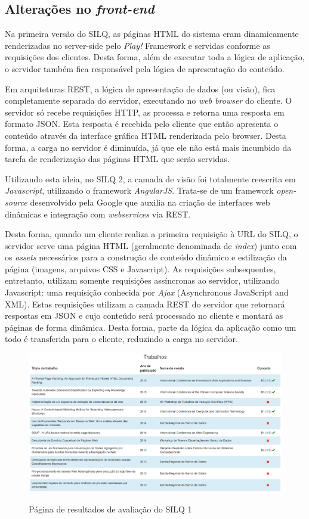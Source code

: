 \documentclass[12pt]{article}
\begin{document}
\subsection{Alterações no \textit{front-end}}

Na primeira versão do SILQ, as páginas HTML do sistema eram dinamicamente renderizadas no server-side pelo \textit{Play!} Framework e servidas conforme as requisições dos clientes. Desta forma, além de executar toda a lógica de aplicação, o servidor também fica responsável pela lógica de apresentação do conteúdo.

Em arquiteturas REST, a lógica de apresentação de dados (ou visão), fica completamente separada do servidor, executando no \textit{web browser} do cliente. O servidor só recebe requisições HTTP, as processa e retorna uma resposta em formato JSON. Esta resposta é recebida pelo cliente que então apresenta o conteúdo através da interface gráfica HTML renderizada pelo browser. Desta forma, a carga no servidor é diminuída, já que ele não está mais incumbido da tarefa de renderização das páginas HTML que serão servidas.

Utilizando esta ideia, no SILQ 2, a camada de visão foi totalmente reescrita em \textit{Javascript}, utilizando o framework \textit{AngularJS}. Trata-se de um framework \textit{open-source} desenvolvido pela Google que auxilia na criação de interfaces web dinâmicas e integração com \textit{webservices} via REST.

Desta forma, quando um cliente realiza a primeira requisição à URL do SILQ, o servidor serve uma página HTML (geralmente denominada de \textit{index}) junto com os \textit{assets} necessários para a construção de conteúdo dinâmico e estilização da página (imagens, arquivos CSS e Javascript). As requisições subsequentes, entretanto, utilizam somente requisições assíncronas ao servidor, utilizando Javascript: uma requisição conhecida por \textit{Ajax} (Asynchronous JavaScript and XML). Estas requisições utilizam a camada REST do servidor que retornará respostas em JSON e cujo conteúdo será processado no cliente e montará as páginas de forma dinâmica. Desta forma, parte da lógica da aplicação como um todo é transferida para o cliente, reduzindo a carga no servidor.

\begin{figure}[!h]
   \centering
   \caption{Página de resultados de avaliação do SILQ 1}
   \includegraphics[width=\textwidth]{../figuras/avaliacao-silq1.png}
   \label{fig:avaliacao-silq1}
\end{figure}
\end{document}
